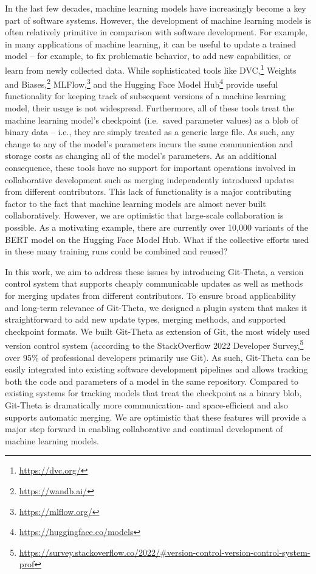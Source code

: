 \documentclass[nohyperref]{article}
\theoremstyle{plain}
\theoremstyle{definition}
\theoremstyle{remark}
\begin{document}
In the last few decades, machine learning models have increasingly become a key part of software systems.
However, the development of machine learning models is often relatively primitive in comparison with software development.
For example, in many applications of machine learning, it can be useful to update a trained model -- for example, to fix problematic behavior, to add new capabilities, or learn from newly collected data.
While sophisticated tools like DVC,\footnote{\url{https://dvc.org/}} Weights and Biases,\footnote{\url{https://wandb.ai/}} MLFlow,\footnote{\url{https://mlflow.org/}} and the Hugging Face Model Hub\footnote{\url{https://huggingface.co/models}} provide useful functionality for keeping track of subsequent versions of a machine learning model, their usage is not widespread.
Furthermore, all of these tools treat the machine learning model's checkpoint (i.e.\ saved parameter values) as a blob of binary data -- i.e., they are simply treated as a generic large file.
As such, any change to any of the model's parameters incurs the same communication and storage costs as changing all of the model's parameters.
As an additional consequence, these tools have no support for important operations involved in collaborative development such as merging independently introduced updates from different contributors.
This lack of functionality is a major contributing factor to the fact that machine learning models are almost never built collaboratively.
However, we are optimistic that large-scale collaboration is possible. 
As a motivating example, there are currently over 10,000 variants of the BERT model on the Hugging Face Model Hub.
What if the collective efforts used in these many training runs could be combined and reused?

In this work, we aim to address these issues by introducing Git-Theta, a version control system that supports cheaply communicable updates as well as methods for merging updates from different contributors.
To ensure broad applicability and long-term relevance of Git-Theta, we designed a plugin system that makes it straightforward to add new update types, merging methods, and supported checkpoint formats.
We built Git-Theta as extension of Git, the most widely used version control system (according to the StackOverflow 2022 Developer Survey,\footnote{\url{https://survey.stackoverflow.co/2022/\#version-control-version-control-system-prof}} over 95\% of professional developers primarily use Git).
As such, Git-Theta can be easily integrated into existing software development pipelines and allows tracking both the code and parameters of a model in the same repository.
Compared to existing systems for tracking models that treat the checkpoint as a binary blob, Git-Theta is dramatically more communication- and space-efficient and also supports automatic merging.
We are optimistic that these features will provide a major step forward in enabling collaborative and continual development of machine learning models.
\end{document}
